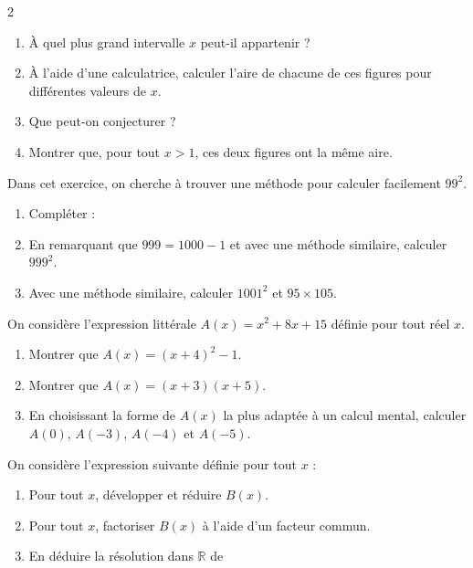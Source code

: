 {\begin{multicols}{2}
\begin{exo}
		  \begin{enumerate}
			  \item À quel plus grand intervalle $x$ peut-il appartenir ?
			  \item À l'aide d'une calculatrice, calculer l'aire de chacune de ces figures pour différentes valeurs de $x$.
			  \item Que peut-on conjecturer ?
			  \item Montrer que, pour tout $x > 1$, ces deux figures ont la même aire.
		  \end{enumerate}
	  \end{exo}

	  \begin{exo}
		  Dans cet exercice, on cherche à trouver une méthode pour calculer facilement $99^2$.

		  \begin{enumerate}
			  \item Compléter : 
			  \item En remarquant que $999 = 1000 - 1$ et avec une méthode similaire, calculer $999^2$.
			  \item Avec une méthode similaire, calculer $1001^2$ et $95 \times 105$.
		  \end{enumerate}
	  \end{exo}

	  \begin{exo}
		  On considère l'expression littérale $A(x) = x^2 + 8x + 15$ définie pour tout réel $x$.
		  \begin{enumerate}
			  \item Montrer que $A(x) = (x + 4)^2 - 1$.
			  \item Montrer que $A(x) = (x + 3)(x + 5)$.
			  \item En choisissant la forme de $A(x)$ la plus adaptée à un calcul mental, calculer $A(0)$, $A(-3)$, $A(-4)$ et $A(-5)$.
		  \end{enumerate}
	  \end{exo}

	  \begin{exo}
		  On considère l'expression suivante définie pour tout $x$ : \cmath{B(x) = (4x + 5)^2 - (4x + 5)(7 - x)}

		  \begin{enumerate}
			  \item Pour tout $x$, développer et réduire $B(x)$.
			  \item Pour tout $x$, factoriser $B(x)$ à l'aide d'un facteur commun.
			  \item En déduire la résolution dans $\mathbb{R}$ de \cmath{20x^2 + 17x - 10 = 0}
		  \end{enumerate}
	  \end{exo}


\end{multicols}}
